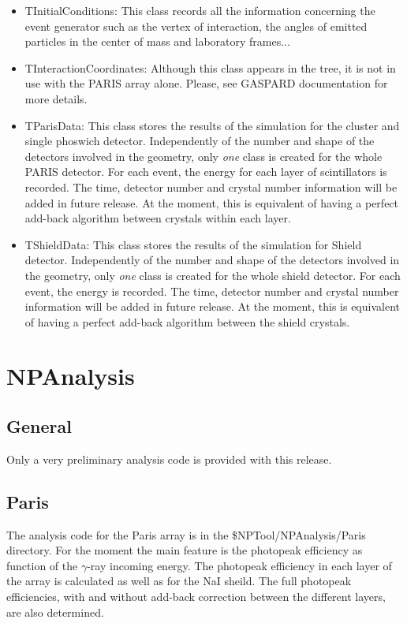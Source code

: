 \documentclass[a4paper,12pt]{article}
\begin{document}
\begin{itemize}
   \item {TInitialConditions:}
      This class records all the information concerning the event generator
      such as the vertex of interaction, the angles of emitted particles in 
      the center of mass and laboratory frames...

   \item {TInteractionCoordinates:}
      Although this class appears in the tree, it is not in use with the PARIS array alone. 
      Please, see GASPARD documentation for more details.

   \item {TParisData:}
      This class stores the results of the simulation for the cluster and single phoswich 
      detector. Independently of the number and shape of the detectors involved in the 
      geometry, only {\it one} class is created for the whole PARIS detector. For each event,
      the energy for each layer of scintillators is recorded. The time, detector number and 
      crystal number information will be added in future release. At the moment, this is 
      equivalent of having a perfect add-back algorithm between crystals within each layer.
      
   \item {TShieldData:}
      This class stores the results of the simulation for Shield detector. 
      Independently of the number and shape of the 
      detectors involved in the geometry, only {\it one} class is created for 
      the whole shield detector. For each event, the energy is recorded.
      The time, detector number and crystal number information will be added in future 
      release. At the moment, this is equivalent of having a perfect add-back algorithm 
      between the shield crystals.
\end{itemize}


\section{NPAnalysis}

\subsection{General}

Only a very preliminary analysis code is provided with this release. 

\subsection{Paris}
The analysis code for the Paris array is in the \$NPTool/NPAnalysis/Paris
directory. For the moment the main feature is the photopeak efficiency as function of the 
$\gamma$-ray incoming energy. The photopeak efficiency in each layer of the array is 
calculated as well as for the NaI sheild. The full photopeak efficiencies, with and without 
add-back correction between the different layers, are also determined. 
\end{document}
